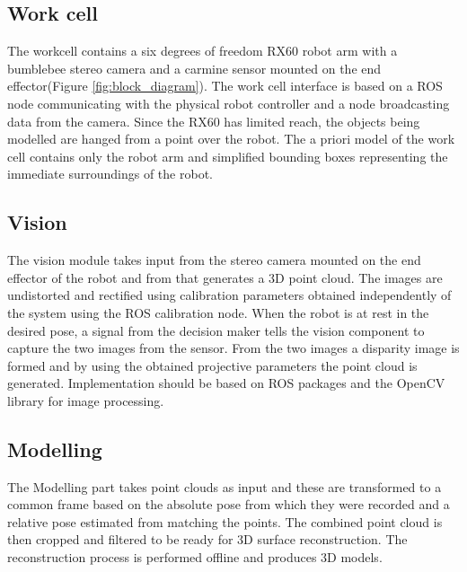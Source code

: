 \subsection{Work cell}
The workcell contains a six degrees of freedom RX60 robot arm with a bumblebee stereo camera and a carmine sensor mounted on the end effector(Figure \ref{fig:block_diagram}). The work cell interface is based on a ROS node communicating with the physical robot controller and a node broadcasting data from the camera. Since the RX60 has limited reach, the objects being modelled are hanged from a point over the robot. The a priori model of the work cell contains only the robot arm and simplified bounding boxes representing the immediate surroundings of the robot. 


\subsection{Vision}
The vision module takes input from the stereo camera mounted on the end effector of the robot and from that generates a 3D point cloud. The images are undistorted and rectified using calibration parameters obtained independently of the system using the ROS calibration node. When the robot is at rest in the desired pose, a signal from the decision maker tells the vision component to capture the two images from the sensor. From the two images a disparity image is formed and by using the obtained projective parameters the point cloud is generated. Implementation should be based on ROS packages and the OpenCV library for image processing.

\subsection{Modelling}
The Modelling part takes point clouds as input and these are transformed to a common frame based on the absolute pose from which they were recorded and a relative pose estimated from matching the points. The combined point cloud is then cropped and filtered to be ready for 3D surface reconstruction. The reconstruction process is performed offline and produces 3D models.

